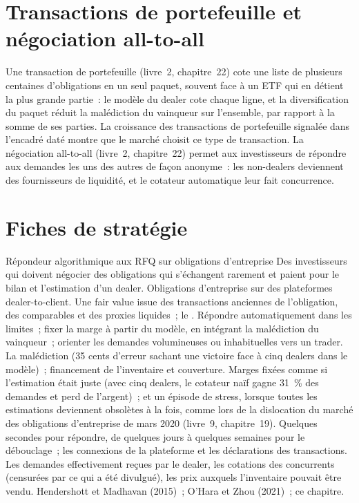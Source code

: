 \section{Transactions de portefeuille et négociation all-to-all}

Une transaction de portefeuille (livre~2, chapitre~22) cote une liste de plusieurs centaines d'obligations en un seul paquet, souvent face à un ETF qui en détient la plus grande
partie~: le modèle du dealer cote chaque ligne, et la diversification du paquet réduit la malédiction du vainqueur sur l'ensemble, par rapport à la somme de ses
parties. La croissance des transactions de portefeuille signalée dans l'encadré daté montre que le marché choisit ce type de transaction. La négociation all-to-all (livre~2, chapitre~22) permet aux investisseurs de répondre
aux demandes les uns des autres de façon anonyme~: les non-dealers deviennent des fournisseurs de liquidité, et le cotateur automatique leur fait concurrence.

\section{Fiches de stratégie}

\begin{strategyfile}{Répondeur algorithmique aux RFQ sur obligations d'entreprise}\label{strat:hf:bond-and-etf-request-for-quote-market-making:corp}
 Des investisseurs qui doivent négocier des obligations qui s'échangent rarement et paient pour le bilan et l'estimation d'un dealer.
 Obligations d'entreprise sur des plateformes dealer-to-client.
 Une fair value issue des transactions anciennes de l'obligation, des comparables et des proxies liquides~; le .
 Répondre automatiquement dans les limites~; fixer la marge à partir du modèle, en intégrant la malédiction du vainqueur~; orienter les demandes volumineuses ou inhabituelles
vers un trader.
 La malédiction (35 cents d'erreur sachant une victoire face à cinq dealers dans le modèle)~; financement de l'inventaire et couverture.
 Marges fixées comme si l'estimation était juste (avec cinq dealers, le cotateur naïf gagne 31~\% des demandes et perd de l'argent)~; et
un épisode de stress, lorsque toutes les estimations deviennent obsolètes à la fois, comme lors de la dislocation du marché des obligations d'entreprise de mars 2020 (livre~9, chapitre~19).
 Quelques secondes pour répondre, de quelques jours à quelques semaines pour le débouclage~; les connexions de la plateforme et les déclarations des transactions.
 Les demandes effectivement reçues par le dealer, les cotations des concurrents (censurées par ce qui a été divulgué), les prix
auxquels l'inventaire pouvait être vendu.
 Hendershott et Madhavan (2015)~; O'Hara et Zhou (2021)~; ce chapitre.
\end{strategyfile}

